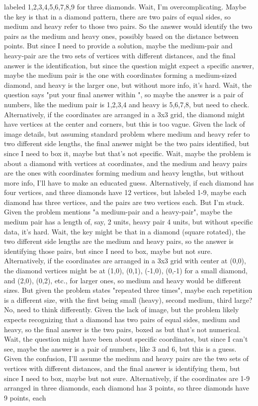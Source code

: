 labeled 1,2,3,4,5,6,7,8,9 for three diamonds. Wait, I'm overcomplicating. Maybe the key is that in a diamond pattern, there are two pairs of equal sides, so medium and heavy refer to those two pairs. So the answer would identify the two pairs as the medium and heavy ones, possibly based on the distance between points. But since I need to provide a solution, maybe the medium-pair and heavy-pair are the two sets of vertices with different distances, and the final answer is the identification, but since the question might expect a specific answer, maybe the medium pair is the one with coordinates forming a medium-sized diamond, and heavy is the larger one, but without more info, it's hard. Wait, the question says "put your final answer within \boxed{}", so maybe the answer is a pair of numbers, like the medium pair is 1,2,3,4 and heavy is 5,6,7,8, but need to check. Alternatively, if the coordinates are arranged in a 3x3 grid, the diamond might have vertices at the center and corners, but this is too vague. Given the lack of image details, but assuming standard problem where medium and heavy refer to two different side lengths, the final answer might be the two pairs identified, but since I need to box it, maybe  but that's not specific. Wait, maybe the problem is about a diamond with vertices at coordinates, and the medium and heavy pairs are the ones with coordinates forming medium and heavy lengths, but without more info, I'll have to make an educated guess. Alternatively, if each diamond has four vertices, and three diamonds have 12 vertices, but labeled 1-9, maybe each diamond has three vertices, and the pairs are two vertices each. But I'm stuck. Given the problem mentions "a medium-pair and a heavy-pair", maybe the medium pair has a length of, say, 2 units, heavy pair 4 units, but without specific data, it's hard. Wait, the key might be that in a diamond (square rotated), the two different side lengths are the medium and heavy pairs, so the answer is identifying those pairs, but since I need to box, maybe  but not sure. Alternatively, if the coordinates are arranged in a 3x3 grid with center at (0,0), the diamond vertices might be at (1,0), (0,1), (-1,0), (0,-1) for a small diamond, and (2,0), (0,2), etc., for larger ones, so medium and heavy would be different sizes. But given the problem states "repeated three times", maybe each repetition is a different size, with the first being small (heavy), second medium, third large? No, need to think differently. Given the lack of image, but the problem likely expects recognizing that a diamond has two pairs of equal sides, medium and heavy, so the final answer is the two pairs, boxed as  but that's not numerical. Wait, the question might have been about specific coordinates, but since I can't see, maybe the answer is a pair of numbers, like 3 and 6, but this is a guess. Given the confusion, I'll assume the medium and heavy pairs are the two sets of vertices with different distances, and the final answer is identifying them, but since I need to box, maybe  but not sure. Alternatively, if the coordinates are 1-9 arranged in three diamonds, each diamond has 3 points, so three diamonds have 9 points, each 